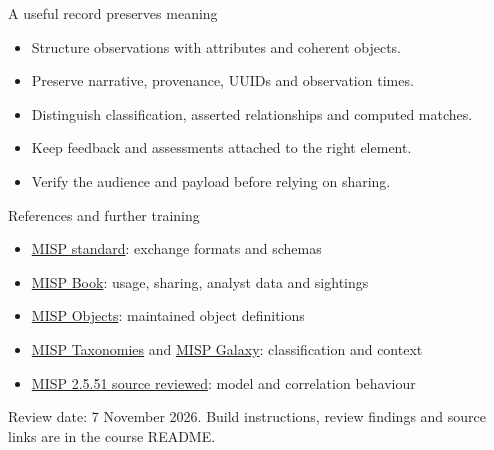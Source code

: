 \begin{frame}{A useful record preserves meaning}
  \begin{itemize}
    \item Structure observations with attributes and coherent objects.
    \item Preserve narrative, provenance, UUIDs and observation times.
    \item Distinguish classification, asserted relationships and computed matches.
    \item Keep feedback and assessments attached to the right element.
    \item Verify the audience and payload before relying on sharing.
  \end{itemize}
\end{frame}

\begin{frame}{References and further training}
  \begin{itemize}
    \item \href{https://www.misp-standard.org/}{MISP standard}: exchange formats and schemas
    \item \href{https://www.circl.lu/doc/misp/}{MISP Book}: usage, sharing, analyst data and sightings
    \item \href{https://github.com/MISP/misp-objects}{MISP Objects}: maintained object definitions
    \item \href{https://github.com/MISP/misp-taxonomies}{MISP Taxonomies} and
      \href{https://github.com/MISP/misp-galaxy}{MISP Galaxy}: classification and context
    \item \href{https://github.com/MISP/MISP/tree/04fc5f8b7ccb52bb6614ca3e9ccdbfdf6585d985}{MISP 2.5.51 source reviewed}: model and correlation behaviour
  \end{itemize}
  \medskip
  Review date: 7 November 2026. Build instructions, review findings and source links are in the course README.
\end{frame}
